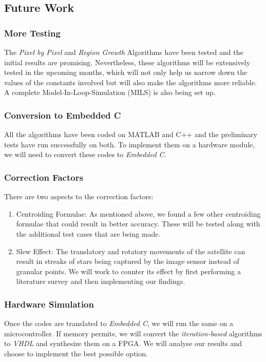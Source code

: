 \documentclass[../../main.tex]{subfiles}
\begin{document}
\subsection{Future Work}

	\subsubsection{More Testing}
	The \textit{Pixel by Pixel} and \textit{Region Growth} Algorithms have been tested and the initial results are promising. Nevertheless, these algorithms will be extensively tested in the upcoming months, which will not only help us narrow down the values of the constants involved but will also make the algorithms more reliable. \\
	A complete Model-In-Loop-Simulation (MILS) is also being set up.

	\subsubsection{Conversion to Embedded C}
	All the algorithms have been coded on MATLAB and C++ and the preliminary tests have run successfully on both. To implement them on a hardware module, we will need to convert these codes to \textit{Embedded C}.

	\subsubsection{Correction Factors}
	There are two aspects to the correction factors:
	\begin{enumerate}
		\item Centroiding Formulae: As mentioned above, we found a few other centroiding formulae\cite{zhang2011star} that could result in better accuracy. These will be tested along with the additional test cases that are being made.
		\item Slew Effect: The translatory and rotatory movements of the satellite can result in streaks of stars being captured by the image sensor instead of granular points. We will work to counter its effect by first performing a literature survey and then implementing our findings.
	\end{enumerate}

	\subsubsection{Hardware Simulation}
	Once the codes are translated to \textit{Embedded C}, we will run the same on a microcontroller. If memory permits, we will convert the \textit{iteration-based} algorithms to \textit{VHDL} and synthesize them on a FPGA. We will analyse our results and choose to implement the best possible option.

\end{document}
